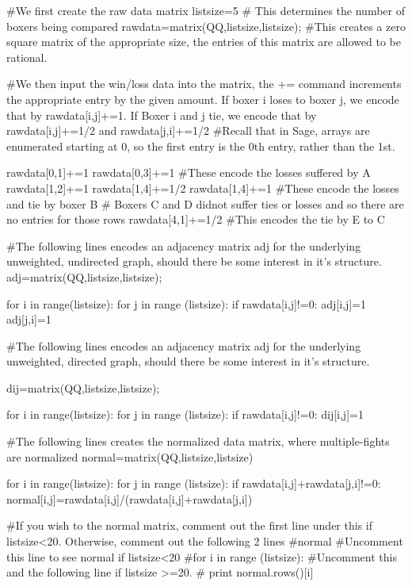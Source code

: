 \documentclass{ximera}
\begin{document}
\begin{sageCell}
#We first create the raw data matrix
listsize=5 # This determines the number of boxers being compared
rawdata=matrix(QQ,listsize,listsize); #This creates a zero square matrix of the appropriate size, the entries of this matrix are allowed to be rational.

#We then input the win/loss data into the matrix, the += command increments the appropriate entry by the given amount.  If boxer i loses to boxer j, we encode that by rawdata[i,j]+=1.  If Boxer i and j tie, we encode that by rawdata[i,j]+=1/2 and rawdata[j,i]+=1/2
#Recall that in Sage, arrays are enumerated starting at 0, so the first entry is the 0th entry, rather than the 1st.

rawdata[0,1]+=1
rawdata[0,3]+=1 #These encode the losses suffered by A
rawdata[1,2]+=1
rawdata[1,4]+=1/2
rawdata[1,4]+=1 #These encode the losses and tie by boxer B
# Boxers C and D didnot suffer ties or losses and so there are no entries for those rows
rawdata[4,1]+=1/2 #This encodes the tie by E to C

#The following lines encodes an adjacency matrix adj for the underlying unweighted, undirected graph, should there be some interest in it's structure.
adj=matrix(QQ,listsize,listsize);

for i in range(listsize):
    for j in range (listsize):
        if rawdata[i,j]!=0:
            adj[i,j]=1
            adj[j,i]=1

            
            
#The following lines encodes an adjacency matrix adj for the underlying unweighted, directed graph, should there be some interest in it's structure.

dij=matrix(QQ,listsize,listsize);

for i in range(listsize):
    for j in range (listsize):
        if rawdata[i,j]!=0:
            dij[i,j]=1


#The following lines creates the normalized data matrix, where multiple-fights are normalized
normal=matrix(QQ,listsize,listsize)

for i in range(listsize):
    for j in range (listsize):
        if rawdata[i,j]+rawdata[j,i]!=0:
            normal[i,j]=rawdata[i,j]/(rawdata[i,j]+rawdata[j,i]) 

#If you wish to the normal matrix, comment out the first line under this if listsize<20.  Otherwise, comment out the following 2 lines
#normal #Uncomment this line to see normal if listsize<20
#for i in range (listsize): #Uncomment this and the following line if listsize >=20.
#    print normal.rows()[i]



\end{sageCell}
\end{document}
